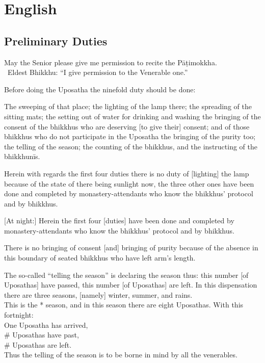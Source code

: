


\chapter{English}

\clearpage



\section{Preliminary Duties}
\label{preliminary-duties}

\begin{intro}
	May the Senior please give me permission to recite the Pāṭimokkha.\\
	\anglebracketleft\ \hspace{-0.5mm}Eldest Bhikkhu: ``I give permission to the Venerable one.'' \hspace{-0.5mm}\anglebracketright\
\end{intro}

Before doing the Uposatha the ninefold duty should be done:

The sweeping of that place; the lighting of the lamp there; the spreading of the sitting mats; the setting out of water for drinking and washing the bringing of the consent of the bhikkhus who are deserving [to give their] consent; and of those bhikkhus who do not participate in the Uposatha the bringing of the purity too; the telling of the season; the counting of the bhikkhus, and the instructing of the bhikkhunīs.

Herein with regards the first four duties there is no duty of [lighting] the lamp because of the state of there being sunlight now, the three other ones have been done and completed by monastery-attendants who know the bhikkhus' protocol and by bhikkhus.

	[At night:] Herein the first four [duties] have been done and completed by monastery-attendants who know the bhikkhus’ protocol and by bhikkhus.

There is no bringing of consent [and] bringing of purity because of the absence in this boundary of seated bhikkhus who have left arm's length.

The so-called ``telling the season'' is declaring the season thus: this number [of Uposathas] have passed, this number [of Uposathas] are left. In this dispensation there are three seasons, [namely] winter, summer, and rains.\\
This is the * season, and in this season there are eight Uposathas. With this fortnight:\\
One Uposatha has arrived,\\
\# Uposathas have past,\\
\# Uposathas are left.\\
Thus the telling of the season is to be borne in mind by all the venerables.

